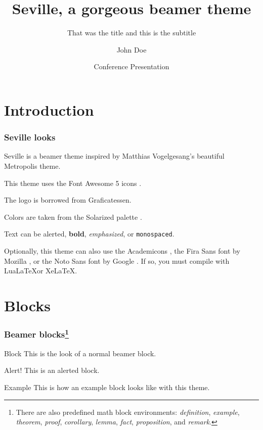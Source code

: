 \documentclass{beamer}
\title{Seville, a gorgeous beamer theme}
\subtitle{That was the title and this is the subtitle}
\author{John Doe}
\date{Conference Presentation \the\year{}}
\institute{University of \LaTeX}
\begin{document}
\begin{frame}

    \titlepage

\end{frame}

\section{Introduction}

\begin{frame}
    \frametitle{Seville looks}

    Seville is a beamer theme inspired by Matthias Vogelgesang's beautiful Metropolis theme.

    This theme uses the Font Awesome 5 icons \faFontAwesome{}.

    The logo is borrowed from Graficatessen.

    Colors are taken from the Solarized palette \faPalette.

    Text can be \alert{alerted}, \textbf{bold}, \emph{emphasized}, or \texttt{monospaced}.

    Optionally, this theme can also use the Academicons \aiAcademiaSquare, the Fira Sans font by Mozilla \faFirefox, or the Noto Sans font by Google \faGoogle. If so, you must compile with Lua\LaTeX or Xe\LaTeX.

\end{frame}

\section{Blocks}

\begin{frame}
    \frametitle{Beamer blocks\footnote{There are also predefined math block environments: \emph{definition}, \emph{example}, \emph{theorem}, \emph{proof}, \emph{corollary}, \emph{lemma}, \emph{fact}, \emph{proposition}, and \emph{remark}.}}

    \begin{block}{Block}
        This is the look of a normal beamer block.
    \end{block}

    \begin{alertblock}{Alert!}
        This is an alerted block.
    \end{alertblock}

    \begin{exampleblock}{Example}
        This is how an example block looks like with this theme.
    \end{exampleblock}

\end{frame}
\end{document}
